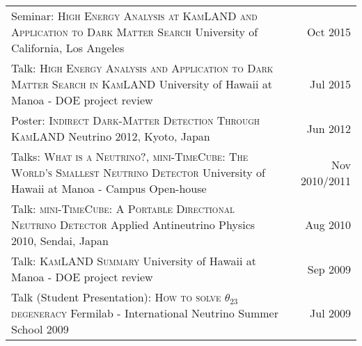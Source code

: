 \documentclass[11pt]{article} %
\begin{document}
\begin{tabularx}{\linewidth}{@{{}\textbullet\enskip}X@{\quad}r@{}}
\addlinespace[5pt]
Seminar: \textsc{High Energy Analysis at KamLAND and Application to Dark Matter Search} \newline University of California, Los Angeles & Oct 2015 \\

\addlinespace[5pt]
Talk: \textsc{High Energy Analysis and Application to Dark Matter Search in KamLAND} \newline University of Hawaii at Manoa - DOE project review & Jul 2015 \\

\addlinespace[5pt]
Poster: \textsc{Indirect Dark-Matter Detection Through KamLAND} \newline Neutrino 2012, Kyoto, Japan & Jun 2012 \\

\addlinespace[5pt]
Talks: \textsc{What is a Neutrino?}, \textsc{mini-TimeCube: The World's Smallest Neutrino Detector} \newline University of Hawaii at Manoa - Campus Open-house & Nov 2010/2011 \\

\addlinespace[5pt]
Talk: \textsc{mini-TimeCube: A Portable Directional Neutrino Detector} \newline Applied Antineutrino Physics 2010, Sendai, Japan & Aug 2010 \\

\addlinespace[5pt]
Talk: \textsc{KamLAND Summary} \newline University of Hawaii at Manoa - DOE project review & Sep 2009 \\

\addlinespace[5pt]
Talk (Student Presentation): \textsc{How to solve $\theta_{23}$ degeneracy} \newline Fermilab - International Neutrino Summer School 2009 & Jul 2009 \\

\end{tabularx}


\clearpage
\renewcommand\refname{Publications} %

\nocite{*} %
%
\end{document}
